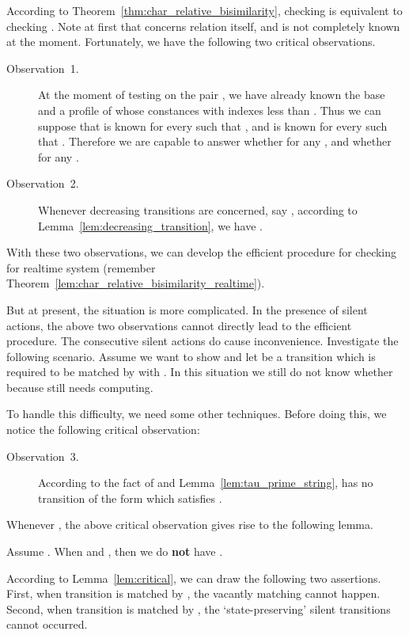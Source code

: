 \documentclass{llncs}
\begin{document}
According to Theorem~\ref{thm:char_relative_bisimilarity}, checking   is equivalent to checking .
Note at first that  concerns relation  itself, and  is not completely known at the moment. Fortunately, we have the following two critical observations.
\begin{description}
\item[Observation~1.]
At the moment of testing on the pair ,  we have already known the base  and a profile of   whose constances with indexes less than . Thus we can suppose that  is known for every  such that , and  is known for every  such that .  Therefore we are capable to answer  whether  for any , and whether  for any .

\item[Observation~2.]
 Whenever decreasing transitions are concerned, say ,  according to Lemma~\ref{lem:decreasing_transition}, we have .
\end{description}
With these two observations, we can develop the efficient procedure for checking  for realtime system (remember Theorem~\ref{lem:char_relative_bisimilarity_realtime}).

But at present, the situation is more complicated. In the presence of silent actions,
the above two observations cannot directly lead to the efficient procedure.   The consecutive silent actions do cause inconvenience. Investigate the following scenario. Assume we want to show  and let  be a transition which is required to be matched by  with . In this situation we still do not know  whether  because  still needs computing.

To handle this difficulty, we need some other techniques. Before doing this,  we notice the following critical observation:

\begin{description}
\item[Observation~3.]
According to the fact of  and Lemma~\ref{lem:tau_prime_string},  has no transition of the form  which satisfies .
\end{description}

Whenever ,
the above critical observation gives rise to the following lemma.
\begin{lemma}\label{lem:critical}
Assume .  When  and  , then  we do \textbf{not} have .
\end{lemma}
According to Lemma~\ref{lem:critical}, we can draw the following two assertions.
First, when transition  is matched by , the vacantly matching cannot happen.
Second, when transition  is matched by , the `state-preserving' silent transitions cannot occurred.
\end{document}
